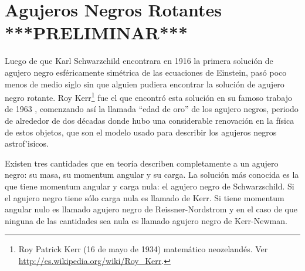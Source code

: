 \chapter{Agujeros Negros Rotantes ***PRELIMINAR***}\label{cap:Kerr}

Luego de que Karl Schwarzchild  encontrara en 1916 la primera soluci\'on de agujero negro esf\'ericamente sim\'etrica de las ecuaciones de Einstein, pas\'o poco menos de medio siglo sin que alguien pudiera encontrar la soluci\'on de agujero negro rotante.  Roy Kerr\footnote{Roy Patrick Kerr (16 de mayo de 1934) matem\'atico neozeland\'es. Ver \url{http://es.wikipedia.org/wiki/Roy_Kerr}.} fue el que encontr\'o esta soluci\'on en su famoso trabajo de 1963 \cite{Kerr63}, comenzando as\'i la llamada ``edad de oro'' de los agujero negros, periodo de alrededor de dos d\'ecadas donde hubo una considerable renovaci\'on en la f\'isica de estos objetos, que son el modelo usado para describir los agujeros negros astrof'isicos.

Existen tres cantidades que en teor\'ia describen completamente a un agujero negro: su masa, su momentum angular y su carga. La soluci\'on m\'as conocida es la que tiene momentum angular y carga nula: el agujero negro de Schwarzschild. Si el agujero negro tiene s\'olo carga nula es llamado de Kerr. Si tiene momentum angular nulo es llamado agujero negro de Reissner-Nordstrom y en el caso de que ninguna de las cantidades sea nula es llamado agujero negro de Kerr-Newman. 



